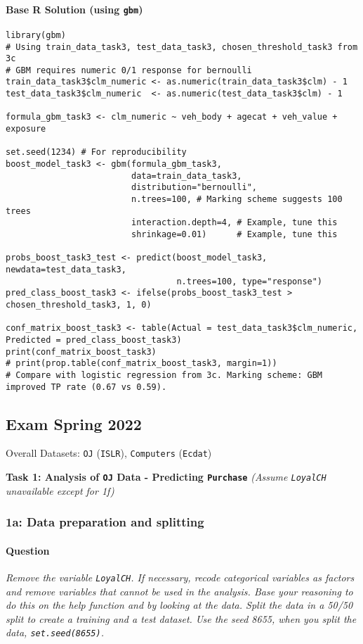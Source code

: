 \documentclass[12pt,a4paper]{article}
\newcommand{\Rpackage}[1]{\texttt{#1}} %
\newcommand{\Robject}[1]{\texttt{#1}} %
\newcommand{\Rcode}[1]{\texttt{#1}} %
\begin{document}
        \paragraph{Base R Solution (using \Rpackage{gbm})}
\begin{lstlisting}[]
library(gbm)
# Using train_data_task3, test_data_task3, chosen_threshold_task3 from 3c
# GBM requires numeric 0/1 response for bernoulli
train_data_task3$clm_numeric <- as.numeric(train_data_task3$clm) - 1
test_data_task3$clm_numeric  <- as.numeric(test_data_task3$clm) - 1

formula_gbm_task3 <- clm_numeric ~ veh_body + agecat + veh_value + exposure

set.seed(1234) # For reproducibility
boost_model_task3 <- gbm(formula_gbm_task3,
                         data=train_data_task3,
                         distribution="bernoulli",
                         n.trees=100, # Marking scheme suggests 100 trees
                         interaction.depth=4, # Example, tune this
                         shrinkage=0.01)      # Example, tune this

probs_boost_task3_test <- predict(boost_model_task3, newdata=test_data_task3, 
                                  n.trees=100, type="response")
pred_class_boost_task3 <- ifelse(probs_boost_task3_test > chosen_threshold_task3, 1, 0)

conf_matrix_boost_task3 <- table(Actual = test_data_task3$clm_numeric, Predicted = pred_class_boost_task3)
print(conf_matrix_boost_task3)
# print(prop.table(conf_matrix_boost_task3, margin=1))
# Compare with logistic regression from 3c. Marking scheme: GBM improved TP rate (0.67 vs 0.59).
\end{lstlisting}


\subsection{Exam Spring 2022}
Overall Datasets: \Robject{OJ} (\Rpackage{ISLR}), \Robject{Computers} (\Rpackage{Ecdat})

\textbf{\Large Task 1: Analysis of \Robject{OJ} Data - Predicting \Robject{Purchase}}
\textit{(Assume \Rcode{LoyalCH} unavailable except for 1f)}
\vspace{0.5em}

    \subsubsection{1a: Data preparation and splitting}
        \paragraph{Question}
        \textit{Remove the variable \Rcode{LoyalCH}. If necessary, recode categorical variables as factors and remove variables that cannot be used in the analysis. Base your reasoning to do this on the help function and by looking at the data. Split the data in a 50/50 split to create a training and a test dataset. Use the seed 8655, when you split the data, \Rcode{set.seed(8655)}.}
\end{document}
